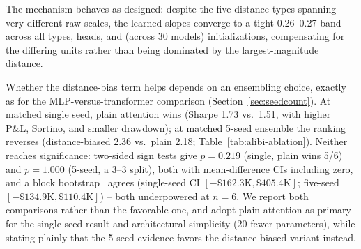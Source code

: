 \documentclass[sigconf,review]{acmart}
\begin{document}
The mechanism behaves as designed: despite the five distance types spanning very different raw scales, the learned slopes converge to a tight 0.26--0.27 band across all types, heads, and (across 30 models) initializations, compensating for the differing units rather than being dominated by the largest-magnitude distance.

Whether the distance-bias term helps depends on an ensembling choice, exactly as for the MLP-versus-transformer comparison (Section~\ref{sec:seedcount}). At matched single seed, plain attention wins (Sharpe 1.73 vs.\ 1.51, with higher P\&L, Sortino, and smaller drawdown); at matched 5-seed ensemble the ranking reverses (distance-biased 2.36 vs.\ plain 2.18; Table~\ref{tab:alibi-ablation}). Neither reaches significance: two-sided sign tests give $p=0.219$ (single, plain wins 5/6) and $p=1.000$ (5-seed, a 3--3 split), both with mean-difference CIs including zero, and a block bootstrap~\cite{kunsch1989} agrees (single-seed CI $[-\$162.3\text{K}, \$405.4\text{K}]$; five-seed $[-\$134.9\text{K}, \$110.4\text{K}]$) -- both underpowered at $n=6$. We report both comparisons rather than the favorable one, and adopt plain attention as primary for the single-seed result and architectural simplicity (20 fewer parameters), while stating plainly that the 5-seed evidence favors the distance-biased variant instead.

\begin{table}[t]
\centering
\footnotesize
{}
\caption{Matched seed-count comparison, identical protocol otherwise (same features, folds, val-loss checkpointing, calibration, and $p\ge0.5$ selection rule): plain attention wins at single-seed, the distance-biased variant wins at 5-seed ensemble, and neither difference is statistically significant (main text).}
\label{tab:alibi-ablation}
\end{table}
\end{document}
